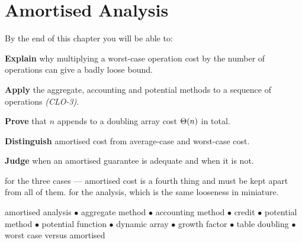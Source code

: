 \chapter{Amortised Analysis}\label{ch:amortised}

\begin{outcomes}
By the end of this chapter you will be able to:
\begin{tight}
  \item \textbf{Explain} why multiplying a worst-case operation cost by the
        number of operations can give a badly loose bound.
  \item \textbf{Apply} the aggregate, accounting and potential methods to a
        sequence of operations \emph{(CLO-3)}.
  \item \textbf{Prove} that $n$ appends to a doubling array cost $\Theta(n)$ in
        total.
  \item \textbf{Distinguish} amortised cost from average-case and worst-case
        cost.
  \item \textbf{Judge} when an amortised guarantee is adequate and when it is
        not.
\end{tight}
\end{outcomes}

\begin{prereq}
 for the three cases --- amortised cost is a fourth thing and must
be kept apart from all of them.  for the 
analysis, which is the same looseness in miniature.
\end{prereq}

\begin{keyterms}
amortised analysis $\bullet$ aggregate method $\bullet$ accounting method
$\bullet$ credit $\bullet$ potential method $\bullet$ potential function
$\bullet$ dynamic array $\bullet$ growth factor $\bullet$ table doubling
$\bullet$ worst case versus amortised
\end{keyterms}

